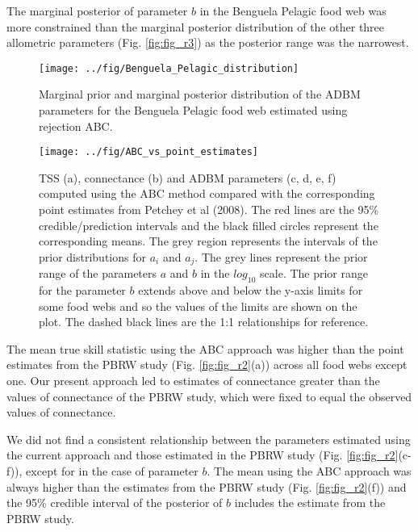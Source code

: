 \documentclass{article}
\begin{document}
The marginal posterior of parameter \(b\) in the Benguela Pelagic food
web was more constrained than the marginal posterior distribution of the
other three allometric parameters (Fig. \ref{fig:fig_r3}) as the
posterior range was the narrowest.

\begin{figure}

{\centering \texttt{[image: ../fig/Benguela\_Pelagic\_distribution]} 

}

\caption{\label{fig:fig_r3} Marginal prior and marginal posterior distribution of the ADBM parameters for the Benguela Pelagic food web estimated using rejection ABC.}\label{fig:unnamed-chunk-6}
\end{figure}

\begin{figure}

{\centering \texttt{[image: ../fig/ABC\_vs\_point\_estimates]} 

}

\caption{\label{fig:fig_r2} TSS (a), connectance (b) and ADBM parameters (c, d, e, f) computed using the ABC method compared with the corresponding point estimates from Petchey et al (2008). The red lines are the 95\% credible/prediction intervals and the black filled circles represent the corresponding means. The grey region represents the intervals of the prior distributions for $a_i$ and $a_j$. The grey lines represent the prior range of the parameters $a$ and $b$ in the $log_{10}$ scale. The prior range for the parameter $b$ extends above and below the y-axis limits for some food webs and so the values of the limits are shown on the plot. The dashed black lines are the 1:1 relationships for reference.}\label{fig:unnamed-chunk-7}
\end{figure}

The mean true skill statistic using the ABC approach was higher than the
point estimates from the PBRW study (Fig. \ref{fig:fig_r2}(a)) across
all food webs except one. Our present approach led to estimates of
connectance greater than the values of connectance of the PBRW study,
which were fixed to equal the observed values of connectance.

We did not find a consistent relationship between the parameters
estimated using the current approach and those estimated in the PBRW
study (Fig. \ref{fig:fig_r2}(c-f)), except for in the case of parameter
\(b\). The mean using the ABC approach was always higher than the
estimates from the PBRW study (Fig. \ref{fig:fig_r2}(f)) and the 95\%
credible interval of the posterior of \(b\) includes the estimate from
the PBRW study.
\end{document}
